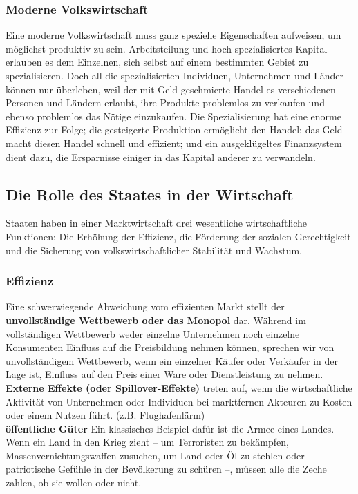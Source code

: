 \documentclass[10pt]{scrartcl}
\begin{document}
\subsubsection{Moderne Volkswirtschaft}
Eine moderne Volkswirtschaft muss ganz spezielle Eigenschaften aufweisen, um möglichst
produktiv zu sein. Arbeitsteilung und hoch spezialisiertes Kapital erlauben es dem Einzelnen, sich selbst auf einem bestimmten Gebiet zu spezialisieren. Doch all die spezialisierten Individuen, Unternehmen und Länder können nur überleben, weil der mit Geld geschmierte Handel es verschiedenen Personen und Ländern erlaubt, ihre Produkte problemlos zu verkaufen und ebenso problemlos das Nötige einzukaufen. Die Spezialisierung hat eine enorme Effizienz zur Folge; die gesteigerte Produktion ermöglicht den Handel; das Geld macht diesen Handel schnell und effizient; und ein ausgeklügeltes Finanzsystem dient dazu, die Ersparnisse einiger in das Kapital anderer zu verwandeln.

\subsection{Die Rolle des Staates in der Wirtschaft}
Staaten haben in einer Marktwirtschaft drei wesentliche wirtschaftliche Funktionen: Die Erhöhung der Effizienz, die Förderung der sozialen Gerechtigkeit und die Sicherung von volkswirtschaftlicher Stabilität und Wachstum.
\subsubsection{Effizienz}
Eine schwerwiegende Abweichung vom effizienten Markt stellt der {\bf unvollständige Wettbewerb oder das Monopol} dar. Während im vollständigen Wettbewerb weder einzelne Unternehmen noch einzelne Konsumenten Einfluss auf die Preisbildung nehmen können, sprechen wir von unvollständigem Wettbewerb, wenn ein einzelner Käufer oder Verkäufer in der Lage ist, Einfluss auf den Preis einer Ware oder Dienstleistung zu nehmen.\\
{\bf Externe Effekte (oder Spillover-Effekte)} treten auf, wenn die wirtschaftliche Aktivität von Unternehmen oder Individuen bei marktfernen Akteuren zu Kosten oder einem Nutzen führt. (z.B. Flughafenlärm)\\
{\bf öffentliche Güter} Ein klassisches Beispiel dafür ist die Armee eines Landes. Wenn
ein Land in den Krieg zieht – um Terroristen zu bekämpfen, Massenvernichtungswaffen zusuchen, um Land oder Öl zu stehlen oder patriotische Gefühle in der Bevölkerung zu schüren –, müssen alle die Zeche zahlen, ob sie wollen oder nicht. 
\end{document}
